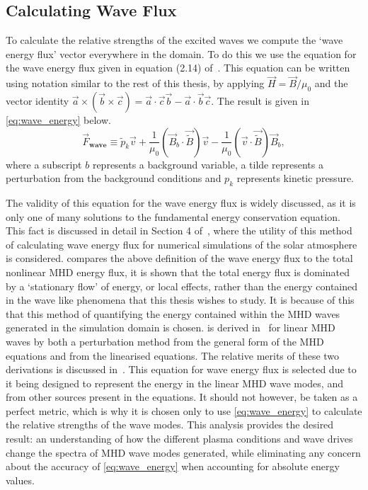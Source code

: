 \subsection{Calculating Wave Flux}\label{sec:waveflux}

To calculate the relative strengths of the excited waves we compute the `wave energy flux' vector everywhere in the domain.
To do this we use the equation for the wave energy flux given in equation (2.14) of~\cite{leroy1985}.
This equation can be written using notation similar to the rest of this thesis, by applying $\vec{H} = \vec{B}/\mu_0$ and the vector identity $\vec{a} \times (\vec{b} \times \vec{c}) = \vec{a} \cdot \vec{c}\vec{b} - \vec{a} \cdot \vec{b}\vec{c}$.
The result is given in \cref{eq:wave_energy} below.
\begin{equation}
\vec{F}_{\textbf{wave}} \equiv \widetilde{p}_k \vec{v} + \frac{1}{\mu_0} \left(\vec{B}_b \cdot \vec{\widetilde{B}}\right) \vec{v} - \frac{1}{\mu_0}\left(\vec{v} \cdot \vec{\widetilde{B}} \right) \vec{B}_b,
\label{eq:wave_energy}
\end{equation}
where a subscript $b$ represents a background variable, a tilde represents a perturbation from the background conditions and $p_k$ represents kinetic pressure.

The validity of this equation for the wave energy flux is widely discussed, as it is only one of many solutions to the fundamental energy conservation equation.
This fact is discussed in detail in Section 4 of~\cite{bogdan2003}, where the utility of this method of calculating wave energy flux for numerical simulations of the solar atmosphere is considered.
\cite{bogdan2003} compares the above definition of the wave energy flux to the total nonlinear MHD energy flux, it is shown that the total energy flux is dominated by a `stationary flow' of energy, or local effects, rather than the energy contained in the wave like phenomena that this thesis wishes to study.
It is because of this that this method of quantifying the energy contained within the MHD waves generated in the simulation domain is chosen.
 is derived in~\cite{leroy1985} for linear MHD waves by both a perturbation method from the general form of the MHD equations and from the linearised equations.
The relative merits of these two derivations is discussed in~\cite{leroy1985}.
This equation for wave energy flux is selected due to it being designed to represent the energy in the linear MHD wave modes, and from other sources present in the equations.
It should not however, be taken as a perfect metric, which is why it is chosen only to use \cref{eq:wave_energy} to calculate the relative strengths of the wave modes.
This analysis provides the desired result: an understanding of how the different plasma conditions and wave drives change the spectra of MHD wave modes generated, while eliminating any concern about the accuracy of \cref{eq:wave_energy} when accounting for absolute energy values.



